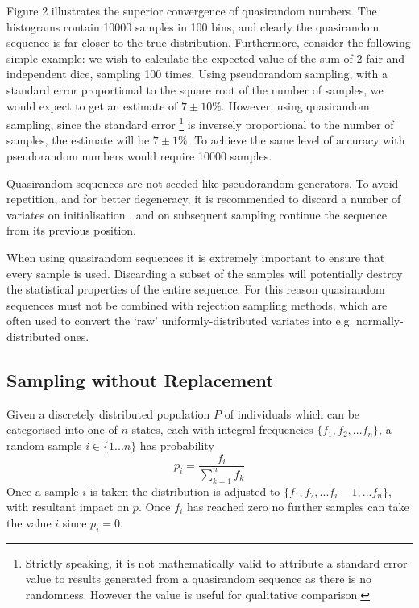 \documentclass{JASSS}
\begin{document}
Figure 2 illustrates the superior convergence of quasirandom numbers. The histograms contain 10000 samples in 100 bins, and clearly the quasirandom sequence is far closer to the true distribution. Furthermore, consider the following simple example: we wish to calculate the expected value of the sum of 2 fair and independent dice, sampling 100 times. Using pseudorandom sampling, with a standard error proportional to the square root of the number of samples, we would expect to get an estimate of \(7 \pm 10\%\). However, using quasirandom sampling, since the standard error
\footnote{Strictly speaking, it is not mathematically valid to attribute a standard error value to results generated from a quasirandom sequence as there is no randomness. However the value is useful for qualitative comparison.} 
  is inversely proportional to the number of samples, the estimate will be \(7 \pm 1\%\). To achieve the same level of accuracy with pseudorandom numbers would require 10000 samples.

Quasirandom sequences are not seeded like pseudorandom generators. To
avoid repetition, and for better degeneracy, it is recommended to
discard a number of variates on initialisation \citep{joe_remark_2003}, and
on subsequent sampling continue the sequence from its previous position.

When using quasirandom sequences it is extremely important to ensure that every sample is used. Discarding a subset of the samples will potentially destroy the statistical properties of the entire sequence. For this reason quasirandom sequences must not be combined with rejection sampling methods, which are often used to convert the `raw' uniformly-distributed variates into e.g. normally-distributed ones.

\subsection{Sampling without Replacement}\label{sampling-without-replacement}

Given a discretely distributed population \(P\) of individuals which can be categorised into one of \(n\) states, each with integral frequencies
\(\{f_1,f_2,...f_n\}\), a random sample \(i \in \{1...n\}\) has
probability
\begin{equation}
p_i = \frac{f_i}{\sum\limits_{k=1}^{n}f_k}
\end{equation}
Once a sample \(i\) is taken the distribution is adjusted to
\(\{f_1,f_2,...f_i-1,...f_n\}\), with resultant impact on \(p\). Once
\(f_i\) has reached zero no further samples can take the value \(i\)
since \(p_i = 0\).
\end{document}
